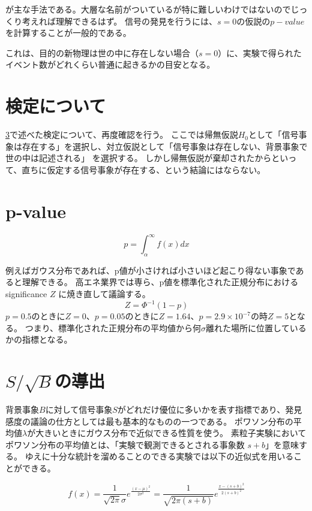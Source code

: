 が主な手法である。大層な名前がついているが特に難しいわけではないのでじっくり考えれば理解できるはず。
信号の発見を行うには、$s=0$の仮説の$p-value$を計算することが一般的である。

これは、目的の新物理は世の中に存在しない場合（$s=0$）に、実験で得られたイベント数がどれくらい普通に起きるかの目安となる。

\section{検定について}

\ref{}で述べた検定について、再度確認を行う。
ここでは帰無仮説$H_0$として「信号事象は存在する」を選択し、対立仮説として「信号事象は存在しない、背景事象で世の中は記述される」
を選択する。
しかし帰無仮説が棄却されたからといって、直ちに仮定する信号事象が存在する、という結論にはならない。

\section{p-value}

\begin{equation}
  p = \int_{\alpha}^{\infty} f(x)dx
\end{equation}

例えばガウス分布であれば、p値が小さければ小さいほど起こり得ない事象であると理解できる。
高エネ業界では専ら、p値を標準化された正規分布におけるsignificance $Z$ に焼き直して議論する。
\begin{equation}
  Z = \Phi^{-1}(1-p)
\end{equation}
$p=0.5$のときに$Z=0$、$p=0.05$のときに$Z=1.64$、$p=2.9\times 10^{-7}$の時$Z=5$となる。
つまり、標準化された正規分布の平均値から何$\sigma$離れた場所に位置しているかの指標となる。

\section{$S/\sqrt{B}$の導出}
背景事象$B$に対して信号事象$S$がどれだけ優位に多いかを表す指標であり、発見感度の議論の仕方としては最も基本的なものの一つである。
ポワソン分布の平均値$\lambda$が大きいときにガウス分布で近似できる性質を使う。
素粒子実験においてポワソン分布の平均値とは、「実験で観測できるとされる事象数 $s+b$」を意味する。
ゆえに十分な統計を溜めることのできる実験では以下の近似式を用いることができる。

\begin{equation}
  f(x)
  = \frac{1}{\sqrt{2\pi}\sigma} e^{\frac{(x-\mu)^2}{2\sigma^2}}
  = \frac{1}{\sqrt{2\pi(s+b)}} e^{\frac{{x-(s+b)}^2}{2(s+b)^2}}
\end{equation}

